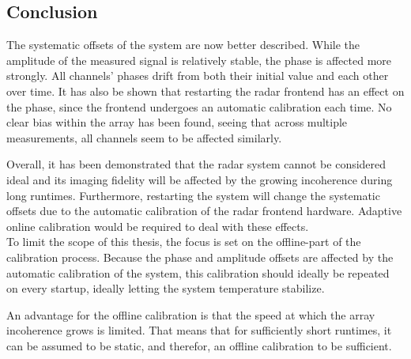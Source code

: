 \subsection{Conclusion}
The systematic offsets of the system are now better described.
While the amplitude of the measured signal is relatively stable, the phase is affected more strongly.
All channels' phases drift from both their initial value and each other over time.
It has also be shown that restarting the radar frontend has an effect on the phase, 
since the frontend undergoes an automatic calibration each time.
No clear bias within the array has been found, seeing that across multiple measurements, 
all channels seem to be affected similarly.

Overall, it has been demonstrated that the radar system cannot be considered ideal and
its imaging fidelity will be affected by the growing incoherence during long runtimes.
Furthermore, restarting the system will change the systematic offsets due to the automatic calibration of the radar frontend hardware.
Adaptive online calibration would be required to deal with these effects. \\

To limit the scope of this thesis, the focus is set on the offline-part of the calibration process.
Because the phase and amplitude offsets are affected by the automatic calibration of the system,
this calibration should ideally be repeated on every startup, ideally letting the system temperature stabilize.

An advantage for the offline calibration is that the speed at which the array incoherence grows is limited.
That means that for sufficiently short runtimes, it can be assumed to be static, and therefor, an offline calibration to be sufficient.